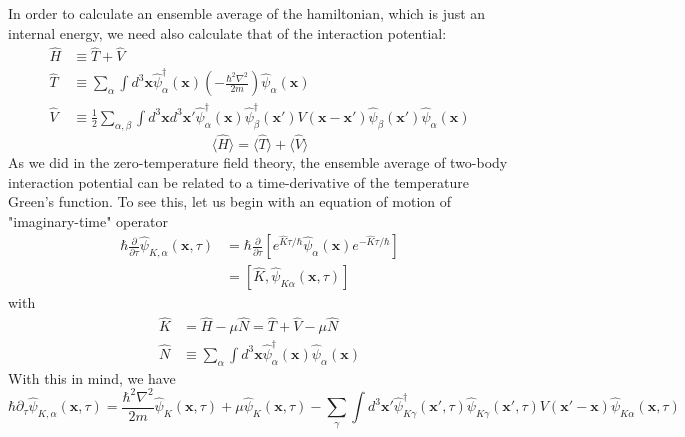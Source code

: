 In order to calculate an ensemble average of the hamiltonian, which is just an internal energy, we need also calculate that of the interaction potential:
\begin{equation}
\begin{aligned}
\hat{H}&\equiv \hat{T}+\hat{V}\\
\hat{T}&\equiv \sum_{\alpha}\int d^{3}\mathbf{x} \hat{\psi}_{\alpha}^{\dagger}(\mathbf{x}) \left(-\frac{\hbar^{2}\nabla^{2}}{2m}\right) \hat{\psi}_{\alpha}(\mathbf{x})\\
\hat{V}&\equiv\frac{1}{2}\sum_{\alpha,\beta}\int d^{3}\mathbf{x} d^{3}\mathbf{x'} \hat{\psi}_{\alpha}^{\dagger}(\mathbf{x}) \hat{\psi}_{\beta}^{\dagger}(\mathbf{x'}) V(\mathbf{x}-\mathbf{x'}) \hat{\psi}_{\beta}(\mathbf{x'}) \hat{\psi}_{\alpha}(\mathbf{x})
\end{aligned}
\end{equation}
$$\langle\hat{H}\rangle=\langle\hat{T}\rangle+\langle\hat{V}\rangle$$
As we did in the zero-temperature field theory, the ensemble average of two-body interaction potential can be related to a time-derivative of the temperature Green's function.
To see this, let us begin with an equation of motion of "imaginary-time" operator
$$
\begin{aligned}
\hbar\frac{\partial}{\partial\tau}\hat{\psi}_{K,\alpha}(\mathbf{x},\tau)&=\hbar \frac{\partial}{\partial\tau} \left[e^{\hat{K}\tau/\hbar} \hat{\psi}_\alpha(\mathbf{x})e^{-\hat{K}\tau/\hbar}\right]\\
&=\left[\hat{K},\hat{\psi}_{K\alpha}(\mathbf{x},\tau)\right]
\end{aligned}
$$
with
\begin{equation}
\begin{aligned}
\hat{K}&=\hat{H}-\mu\hat{N}=\hat{T}+\hat{V}-\mu\hat{N}\\
\hat{N}&\equiv\sum_{\alpha}\int d^{3}\mathbf{x}\hat{\psi}_{\alpha}^{\dagger}(\mathbf{x})\hat{\psi}_{\alpha}(\mathbf{x})
\end{aligned}
\end{equation}
With this in mind, we have
\begin{equation}
\hbar\partial_{\tau}\hat{\psi}_{K,\alpha}(\mathbf{x},\tau)=\frac{\hbar^{2}\nabla^{2}}{2m}\hat{\psi}_{K}(\mathbf{x},\tau)+\mu\hat{\psi}_{K}(\mathbf{x},\tau) - \sum_{\gamma}\int d^{3}\mathbf{x'}\hat{\psi}_{K\gamma}^{\dagger}(\mathbf{x'},\tau)\hat{\psi}_{K\gamma}(\mathbf{x'},\tau)V(\mathbf{x'}-\mathbf{x})\hat{\psi}_{K\alpha}(\mathbf{x},\tau)
\end{equation}
